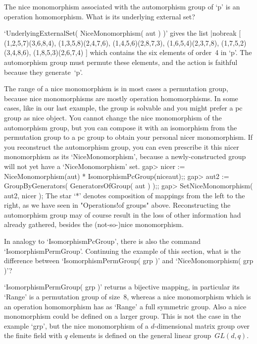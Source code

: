 \exercise The nice monomorphism associated with the automorphism group of
`p' is an operation homomorphism. What is its underlying external set?

\answer `UnderlyingExternalSet( NiceMonomorphism( aut ) )' gives the list
\begintt|nobreak
    [ (1,2,5,7)(3,6,8,4), (1,3,5,8)(2,4,7,6), (1,4,5,6)(2,8,7,3), 
      (1,6,5,4)(2,3,7,8), (1,7,5,2)(3,4,8,6), (1,8,5,3)(2,6,7,4) ]
\endtt
which contains the six elements of order~4 in `p'. The automorphism group
must permute  these elements,  and the  action  is faithful because  they
generate~`p'.

The range  of a nice  monomorphism is in most  cases a permutation group,
because nice  monomorphisms are  mostly operation homomorphisms.  In some
cases, like  in our  last example,  the group is   solvable and you might
prefer a pc group as nice object. You cannot change the nice monomorphism
of the automorphism  group, but  you  can compose it  with an isomorphism
from the permutation  group to a pc  group to obtain your personal  nicer
monomorphism. If you  reconstruct the automorphism   group, you can  even
prescribe it this nicer monomorphism as its `NiceMonomorphism', because a
newly-constructed group will not yet have a `NiceMonomorphism' set.
\beginexample
    gap> nicer := NiceMonomorphism(aut) * IsomorphismPcGroup(niceaut);;
    gap> aut2 := GroupByGenerators( GeneratorsOfGroup( aut ) );;
    gap> SetNiceMonomorphism( aut2, nicer );
\endexample
The star `*' denotes composition of mappings  from the left to the right,
as we  have  seen in  "Operations!of  groups" above.   Reconstructing the
automorphism group may of course result in the  loss of other information
{\GAP} had already gathered, besides the (not-so-)nice monomorphism.

\exercise In  analogy to `IsomorphismPcGroup', there  is also the command
`IsomorphismPermGroup'. Continuing  the example of  this section, what is
the    difference   between      `IsomorphismPermGroup(   grp  )'     and
`NiceMonomorphism( grp )'?

\answer `IsomorphismPermGroup( grp  )'  returns a bijective   mapping, in
particular its  `Range' is a permutation  group of size~8, whereas a nice
monomorphism  which  is an operation homomorphism   has as `Range' a full
symmetric group. Also a  nice monomorphism could  be defined on a  larger
group. This is   not   the case in   the   example `grp', but   the  nice
monomorphism of a $d$-dimensional matrix group over the finite field with
$q$ elements is defined on the general linear group~$GL(d,q)$.

